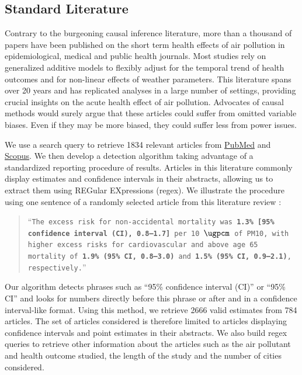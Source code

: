 \documentclass[12pt]{article}
\begin{document}
    \subsection{Standard Literature}

        Contrary to the burgeoning causal inference literature, more than a thousand of papers have been published on the short term health effects of air pollution in epidemiological, medical and public health journals. Most studies rely on generalized additive models to flexibly adjust for the temporal trend of health outcomes and for non-linear effects of weather parameters. This literature spans over 20 years and has replicated analyses in a large number of settings, providing crucial insights on the acute health effect of air pollution. Advocates of causal methods would surely argue that these articles could suffer from omitted variable biases. Even if they may be more biased, they could suffer less from power issues.
        
        We use a search query to retrieve 1834 relevant articles from  \href{https://www.ncbi.nlm.nih.gov/}{PubMed} and \href{https://www.scopus.com/home.uri}{Scopus}. We then develop a detection algorithm taking advantage of a standardized reporting procedure of results. Articles in this literature commonly display estimates and confidence intervals in their abstracts, allowing us to extract them using REGular EXpressions (regex). We illustrate the procedure using one sentence of a randomly selected article from this literature review \citep{vichit-vadakan_public_2008}:
        
        \begin{quote}
             “\texttt{The excess risk for non-accidental mortality was \textbf{\color{cerulean}1.3\% [95\% confidence interval (CI), 0.8–1.7]} per 10 $\si{\ugpcm}$ of PM10, with higher excess risks for cardiovascular and above age 65 mortality of \textbf{\color{cerulean}1.9\% (95\% CI, 0.8–3.0)} and \textbf{\color{cerulean}1.5\% (95\% CI, 0.9–2.1)}, respectively.}”
        \end{quote}
        
        Our algorithm detects phrases such as “95\% confidence interval (CI)” or “95\% CI” and looks for numbers directly before this phrase or after and in a confidence interval-like format. Using this method, we retrieve 2666 valid estimates from 784 articles. The set of articles considered is therefore limited to articles displaying confidence intervals and point estimates in their abstracts. We also build regex queries to retrieve other information about the articles such as the air pollutant and health outcome studied, the length of the study and the number of cities considered. 
        
\end{document}
